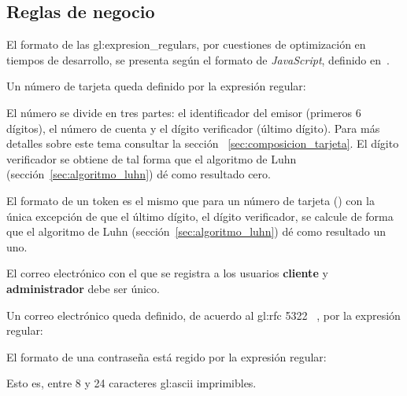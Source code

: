 %
%

\subsection{Reglas de negocio}
\label{sec:reglas_de_negocio}

El formato de las \glspl{gl:expresion_regular}, por cuestiones de optimización
en tiempos de desarrollo, se presenta según el formato de \textit{JavaScript},
definido en~\cite{mozilla_er}.

{
  Un número de tarjeta queda definido por la expresión regular:


  El número se divide en tres partes: el identificador del emisor (primeros 6
  dígitos), el número de cuenta y el dígito verificador (último dígito). Para
  más detalles sobre este tema consultar la sección
 ~\ref{sec:composicion_tarjeta}. El dígito verificador se obtiene de tal forma
  que el algoritmo de Luhn (sección~\ref{sec:algoritmo_luhn}) dé como resultado
  cero.
}

{
  El formato de un token es el mismo que para un número de tarjeta
  () con la única excepción de que el
  último dígito, el dígito verificador, se calcule de forma que el algoritmo de
  Luhn (sección~\ref{sec:algoritmo_luhn}) dé como resultado un uno.
}

{
  El correo electrónico con el que se registra a los usuarios \textbf{cliente}
  y \textbf{administrador} debe ser único.
}

{
  Un correo electrónico queda definido, de acuerdo al \gls{gl:rfc} 5322
 ~\cite{DBLP:journals/rfc/rfc5322}, por la expresión regular:

}

{
  El formato de una contraseña está regido por la expresión regular:


  Esto es, entre 8 y 24 caracteres \gls{gl:ascii} imprimibles.
}


